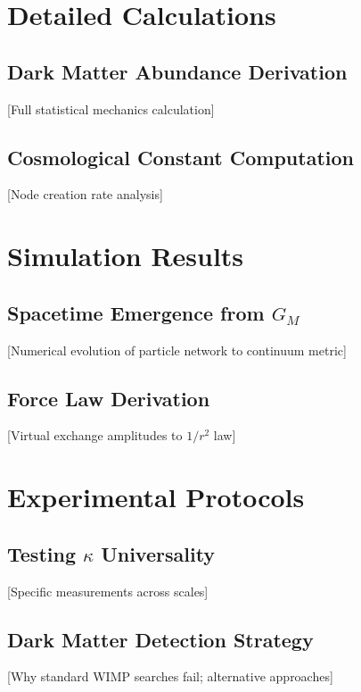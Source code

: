 \documentclass[11pt]{article}
\theoremstyle{plain}
\theoremstyle{definition}
\begin{document}
\appendix

\section{Detailed Calculations}
\subsection{Dark Matter Abundance Derivation}
[Full statistical mechanics calculation]

\subsection{Cosmological Constant Computation}
[Node creation rate analysis]

\section{Simulation Results}
\subsection{Spacetime Emergence from $G_M$}
[Numerical evolution of particle network to continuum metric]

\subsection{Force Law Derivation}
[Virtual exchange amplitudes to $1/r^2$ law]

\section{Experimental Protocols}
\subsection{Testing $\kappa$ Universality}
[Specific measurements across scales]

\subsection{Dark Matter Detection Strategy}
[Why standard WIMP searches fail; alternative approaches]


% 
\end{document}
